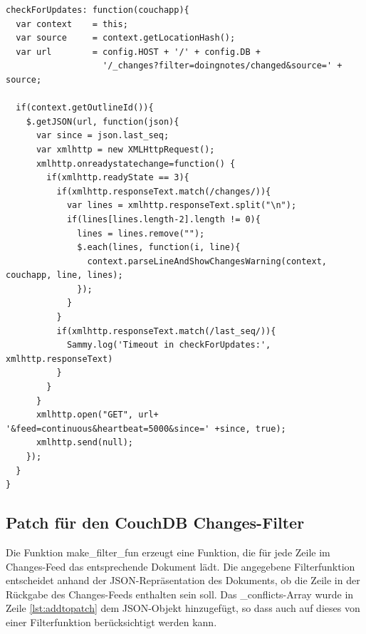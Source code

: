 \lstset{language=javascript}
\medskip 
\begin{lstlisting}[label=code:changesfeed, caption= {\fontfamily{pcr}\selectfont /\_attachments/app/helpers/replication\_helpers.js}]
checkForUpdates: function(couchapp){
  var context    = this;
  var source     = context.getLocationHash();
  var url        = config.HOST + '/' + config.DB + 
                   '/_changes?filter=doingnotes/changed&source=' + source;   
  
  if(context.getOutlineId()){ 
    $.getJSON(url, function(json){
      var since = json.last_seq;
      var xmlhttp = new XMLHttpRequest();
      xmlhttp.onreadystatechange=function() {
        if(xmlhttp.readyState == 3){
          if(xmlhttp.responseText.match(/changes/)){
            var lines = xmlhttp.responseText.split("\n");
            if(lines[lines.length-2].length != 0){ 
              lines = lines.remove("");
              $.each(lines, function(i, line){
                context.parseLineAndShowChangesWarning(context, couchapp, line, lines);
              });
            }
          }
          if(xmlhttp.responseText.match(/last_seq/)){
            Sammy.log('Timeout in checkForUpdates:', xmlhttp.responseText)
          }
        }
      }
      xmlhttp.open("GET", url+ '&feed=continuous&heartbeat=5000&since=' +since, true);
      xmlhttp.send(null);
    });
  }
}
\end{lstlisting}








\subsection{Patch für den CouchDB Changes-Filter}
\label{subsec:changes-patch}



Die Funktion {\selectfont make\_filter\_fun} erzeugt eine Funktion, die für jede Zeile im Changes-Feed das entsprechende Dokument lädt. Die angegebene Filterfunktion entscheidet anhand der JSON-Repräsentation des Dokuments, ob die Zeile in der Rückgabe des Changes-Feeds enthalten sein soll. Das {\selectfont \_conflicts}-Array wurde in Zeile \ref{lst:addtopatch} dem JSON-Objekt hinzugefügt, so dass auch auf dieses von einer Filterfunktion berücksichtigt werden kann.



